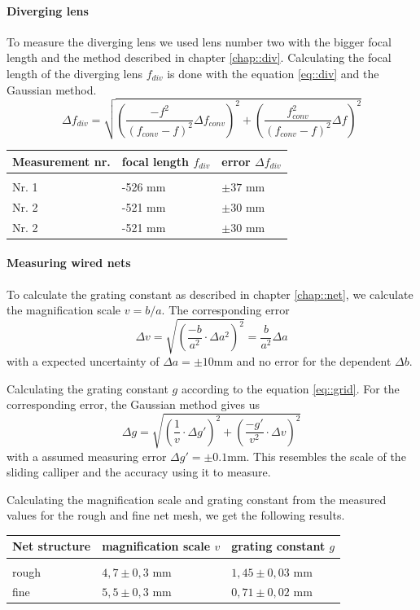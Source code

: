 \paragraph{Diverging lens}
To measure the diverging lens we used lens number two with the bigger focal length and the method described in chapter \ref{chap::div}.
Calculating the focal length of the diverging lens $f_{div}$ is done with the equation \ref{eq::div} and the Gaussian method.
\[
\Delta f_{div}= \sqrt{\left(\frac{-f^2}{(f_{conv}-f)^2} \Delta f_{conv}\right)^2+  \left(\frac{f_{conv}^2}{(f_{conv}-f)^2} \Delta f \right)^2}
\] 


\begin{tabularx}{\textwidth}{XM{5cm}M{5cm}}%
	\toprule 
	Measurement nr.&focal length $f_{div}$ & error $\Delta f_{div}$\\
	\hline
	&&\\[-5pt]
	Nr. 1	& -526 \si{\milli \m} & $\pm 37$ \si{\milli \m}	\\
	Nr. 2	& -521 \si{\milli \m} & $\pm 30$ \si{\milli \m}	\\
	Nr. 2	& -521 \si{\milli \m} & $\pm 30$ \si{\milli \m}	\\	
	\bottomrule 
\end{tabularx}

\paragraph{Measuring wired nets}
To calculate the grating constant as described in chapter \ref{chap::net}, we calculate the magnification scale $v= b/a$.
The corresponding error 
\[
\Delta v= \sqrt{\left(\frac{-b}{a^2} \cdot \Delta a^2\right)^2} = \frac{b}{a^2} \Delta a
\] 
with a expected uncertainty of $\Delta a =\pm 10$\si{\milli \m} and no error for the dependent $\Delta b$.

Calculating the grating constant $g$ according to the equation \ref{eq::grid}.
For the corresponding error, the Gaussian method gives us 
\[
\Delta g= \sqrt{\left(\frac{1}{v} \cdot \Delta g'\right)^2 + \left(\frac{-g'}{v^2} \cdot \Delta v\right)^2}  
\]
with a assumed measuring error $\Delta g' = \pm 0.1$\si{\milli \m}.
This resembles the scale of the sliding calliper and the accuracy using it to measure.

Calculating the magnification scale and grating constant from the measured values for the rough and fine net mesh, we get the following results.

\begin{tabularx}{\textwidth}{XM{5cm}M{5cm}}%
	\toprule 
	Net structure&magnification scale $v$ & grating constant $g$\\
	\hline
	&&\\[-5pt]
	rough	& $4,7\pm 0,3$ \si{\milli \m} & $1,45 \pm 0,03$ \si{\milli \m}	\\
	fine	& $5,5\pm 0,3$ \si{\milli \m} & $0,71 \pm 0,02$ \si{\milli \m}	\\	
	\bottomrule 
\end{tabularx}


